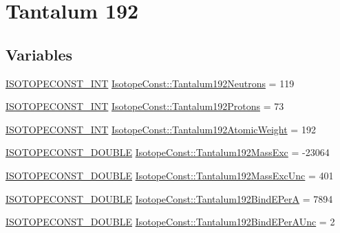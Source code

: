 \hypertarget{group___isotope_const-_tantalum-_ta192}{}\section{Tantalum 192}
\label{group___isotope_const-_tantalum-_ta192}
\subsection*{Variables}
\begin{DoxyCompactItemize}
\item 
\mbox{\hyperlink{group___isotope_const-_macros_ga5f18360b3e99483a35c32d789e62621c}{I\+S\+O\+T\+O\+P\+E\+C\+O\+N\+S\+T\+\_\+\+I\+NT}} \mbox{\hyperlink{group___isotope_const-_tantalum-_ta192_ga0fbcc2980ca84fd24e5a422761e48def}{Isotope\+Const\+::\+Tantalum192\+Neutrons}} = 119
\item 
\mbox{\hyperlink{group___isotope_const-_macros_ga5f18360b3e99483a35c32d789e62621c}{I\+S\+O\+T\+O\+P\+E\+C\+O\+N\+S\+T\+\_\+\+I\+NT}} \mbox{\hyperlink{group___isotope_const-_tantalum-_ta192_ga8805a722345490fa88cdf9c3654ba3d6}{Isotope\+Const\+::\+Tantalum192\+Protons}} = 73
\item 
\mbox{\hyperlink{group___isotope_const-_macros_ga5f18360b3e99483a35c32d789e62621c}{I\+S\+O\+T\+O\+P\+E\+C\+O\+N\+S\+T\+\_\+\+I\+NT}} \mbox{\hyperlink{group___isotope_const-_tantalum-_ta192_ga79e75f4b5f65839b4823e83082b0ab4f}{Isotope\+Const\+::\+Tantalum192\+Atomic\+Weight}} = 192
\item 
\mbox{\hyperlink{group___isotope_const-_macros_ga8f45a7272ce02c0b4c65c44636ed719a}{I\+S\+O\+T\+O\+P\+E\+C\+O\+N\+S\+T\+\_\+\+D\+O\+U\+B\+LE}} \mbox{\hyperlink{group___isotope_const-_tantalum-_ta192_gaf80206db9a2f3fcec650f12a20aabd13}{Isotope\+Const\+::\+Tantalum192\+Mass\+Exc}} = -\/23064
\item 
\mbox{\hyperlink{group___isotope_const-_macros_ga8f45a7272ce02c0b4c65c44636ed719a}{I\+S\+O\+T\+O\+P\+E\+C\+O\+N\+S\+T\+\_\+\+D\+O\+U\+B\+LE}} \mbox{\hyperlink{group___isotope_const-_tantalum-_ta192_ga047527e85b1acd908b9f1a509d77a5dd}{Isotope\+Const\+::\+Tantalum192\+Mass\+Exc\+Unc}} = 401
\item 
\mbox{\hyperlink{group___isotope_const-_macros_ga8f45a7272ce02c0b4c65c44636ed719a}{I\+S\+O\+T\+O\+P\+E\+C\+O\+N\+S\+T\+\_\+\+D\+O\+U\+B\+LE}} \mbox{\hyperlink{group___isotope_const-_tantalum-_ta192_ga763e4804f300a2e2227cff0c1ea5e47c}{Isotope\+Const\+::\+Tantalum192\+Bind\+E\+PerA}} = 7894
\item 
\mbox{\hyperlink{group___isotope_const-_macros_ga8f45a7272ce02c0b4c65c44636ed719a}{I\+S\+O\+T\+O\+P\+E\+C\+O\+N\+S\+T\+\_\+\+D\+O\+U\+B\+LE}} \mbox{\hyperlink{group___isotope_const-_tantalum-_ta192_ga9a779f91fd2d7d3862504957bae680e3}{Isotope\+Const\+::\+Tantalum192\+Bind\+E\+Per\+A\+Unc}} = 2

\end{DoxyCompactItemize}

